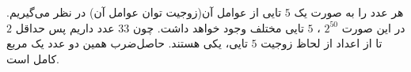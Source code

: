\p
هر عدد را به صورت یک
$5$
تایی از عوامل آن(زوجیت توان عوامل آن) در نظر می‌گیریم. در این صورت
$2^{50}$
،
$5$
تایی مختلف وجود خواهد داشت. چون
$33$
عدد داریم پس حداقل
$2$
تا از اعداد از لحاظ زوجیت
$5$
تایی، یکی هستند. حاصل‌ضرب همین دو عدد یک مربع کامل است.